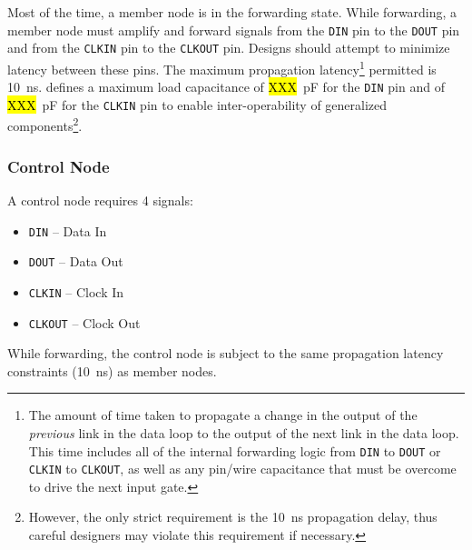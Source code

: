 Most of the time, a member node is in the {\sc forwarding} state. While
forwarding, a member node must amplify and forward signals from the {\tt DIN}
pin to the {\tt DOUT} pin and from the {\tt CLKIN} pin to the {\tt CLKOUT} pin.
Designs should attempt to minimize latency between these pins. The maximum
propagation latency\footnote{
  The amount of time taken to propagate a change in the output of the {\em
  previous} link in the data loop to the output of the next link in the data
  loop. This time includes all of the internal forwarding logic from {\tt DIN}
  to {\tt DOUT} or {\tt CLKIN} to {\tt CLKOUT}, as well as any pin/wire
  capacitance that must be overcome to drive the next input gate.
  }
permitted is 10~ns. \bus defines a maximum load capacitance of \hl{XXX}~pF for
the {\tt DIN} pin and of \hl{XXX}~pF for the {\tt CLKIN} pin to enable
inter-operability of generalized components\footnote{
  However, the only strict requirement is the 10~ns propagation delay, thus
  careful designers may violate this requirement if necessary.
  }.

\subsubsection{Control Node}
\label{sec:physical-control}
A control node requires 4 signals:

\begin{itemize}
  \item {\tt DIN} -- Data In
  \item {\tt DOUT} -- Data Out
  \item {\tt CLKIN} -- Clock In
  \item {\tt CLKOUT} -- Clock Out
\end{itemize}

While forwarding, the control node is subject to the same propagation latency
constraints (10~ns) as member nodes.


